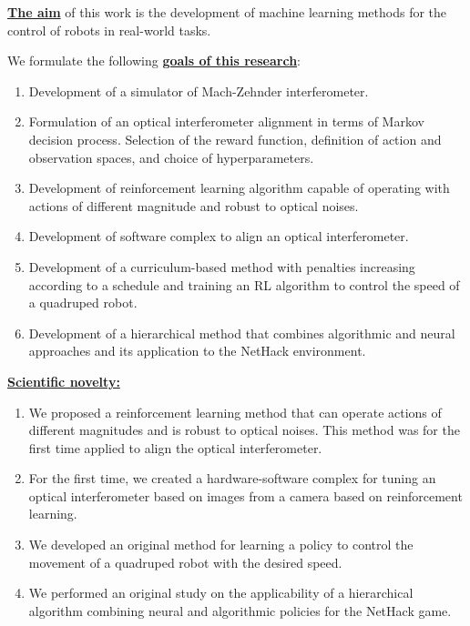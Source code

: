 \underline{\textbf{The aim}} of this work is the development of machine learning methods for the control of robots in real-world tasks.

We formulate the following \underline{\textbf{goals of this research}}:
\begin{enumerate}[beginpenalty=10000] %
  \item Development of a simulator of Mach-Zehnder interferometer.
  \item Formulation of an optical interferometer alignment in terms of Markov decision process. Selection of the reward function, definition of action and observation spaces, and choice of hyperparameters.
  \item Development of reinforcement learning algorithm capable of operating with actions of different magnitude and robust to optical noises.
  \item Development of software complex to align an optical interferometer.
  \item Development of a curriculum-based method with penalties increasing according to a schedule and training an RL algorithm to control the speed of a quadruped robot.
  \item Development of a hierarchical method that combines algorithmic and neural approaches and its application to the NetHack environment.
\end{enumerate}


\underline{\textbf{Scientific novelty:}}
\begin{enumerate}[beginpenalty=10000] %
  \item We proposed a reinforcement learning method that can operate actions of different magnitudes and is robust to optical noises. This method was for the first time applied to align the optical interferometer.
  \item For the first time, we created a hardware-software complex for tuning an optical interferometer based on images from a camera based on reinforcement learning.
  \item We developed an original method for learning a policy to control the movement of a quadruped robot with the desired speed.
  \item We performed an original study on the applicability of a hierarchical algorithm combining neural and algorithmic policies for the NetHack game.
\end{enumerate}

